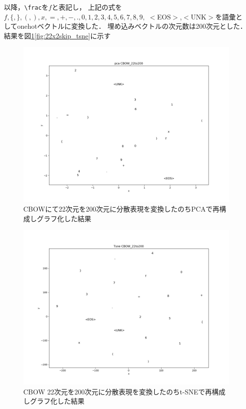 \documentclass[a4j,11pt,report]{jsbook}
\begin{document}
\begin{multicols}{2}
  \begin{quote}
  \end{quote}
\end{multicols}

以降，\verb#\frac#を$f$と表記し，
上記の式を$f,\{,\},(,),x,=,+,-,.,0,1,2,3,4,5,6,7,8,9,$ $<$EOS$>$,$<$UNK$>$を語彙としてonehotベクトルに変換した．
埋め込みベクトルの次元数は200次元とした．
結果を図\ref{fig:89x2cbow_pac}\ref{fig:22x2skip_tsne}に示す

\begin{center}
  \begin{figure}[H]
    \centering
    \includegraphics[width=0.8\linewidth]{image/CBOW_pca_out22_200.png}
    \caption{CBOWにて22次元を200次元に分散表現を変換したのちPCAで再構成しグラフ化した結果}
    \label{fig:89x2cbow_pac}
  \end{figure}
\end{center}


\begin{center}
  \begin{figure}[H]
    \centering
    \includegraphics[width=0.8\linewidth]{image/CBOW_tsne_out22_200.png}
    \caption{CBOW 22次元を200次元に分散表現を変換したのちt-SNEで再構成しグラフ化した結果}
    \label{fig:89x2cbow_tsne}
  \end{figure}
\end{center}
\end{document}

